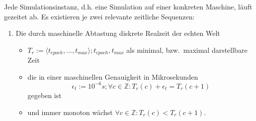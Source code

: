 Jede Simulationsinstanz, d.h. eine Simulation auf einer konkreten Maschine, läuft gezeitet ab. Es existieren je zwei relevante zeitliche Sequenzen:
\begin{enumerate}
\item Die durch maschinelle Abtastung diskrete Realzeit der echten Welt\\
	\begin{itemize}
	\item $T_r:=\langle t_{epoch}, ... , t_{max}\rangle ; t_{epoch}, t_{max}$ als minimal, bzw.~maximal darstellbare Zeit
	\item die in einer maschinellen Genauigkeit in Mikrosekunden $$\epsilon_t:=10^{-6}s ; \forall c \in \mathbb{Z}: T_r(c) + \epsilon_t = T_r(c+1)$$ gegeben ist
	\item und immer monoton wächst $\forall c \in \mathbb{Z}: T_r(c) < T_r(c+1)$. 
	\end{itemize}
	


\end{enumerate}
